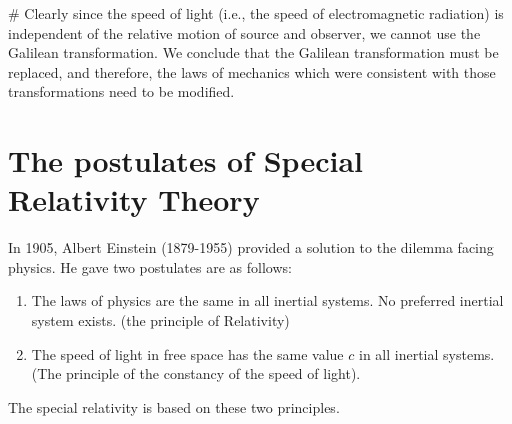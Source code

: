 \documentclass[../main-sheet.tex]{subfiles}
\begin{document}
\# Clearly since the speed of light (i.e., the speed of electromagnetic radiation) is independent of the relative motion of source and observer, we cannot use the Galilean transformation. We conclude that the Galilean transformation must be replaced, and therefore, the laws of mechanics which were consistent with those transformations need to be modified.

\section{The postulates of Special Relativity Theory}
In 1905, Albert Einstein (1879-1955) provided a solution to the dilemma facing physics. He gave two postulates are as follows:
\begin{enumerate}
    \item The laws of physics are the same in all inertial systems. No preferred inertial system exists. (the principle of Relativity)
    \item The speed of light in free space has the same value \(c \) in all inertial systems. (The principle of the constancy of the speed of light).
\end{enumerate}
The special relativity is based on these two principles.\\
\end{document}
